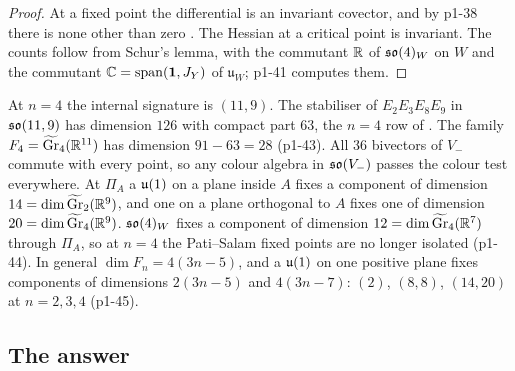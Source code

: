 \begin{proof}
At a fixed point the differential is an invariant covector, and by p1-38 there is none other than zero \cite{Michel71,Palais79}. The Hessian at a critical point is invariant. The
counts follow from Schur's lemma, with the commutant $\mathbb{R}$ of $\mathfrak{so}(4)_W$ on $W$ and the commutant $\mathbb{C}=\operatorname{span}(\mathbf 1,J_Y)$ of $\mathfrak u_W$; p1-41 computes them.
\end{proof}

\begin{remark}
\label{p1:rem:n4}
At $n=4$ the internal signature is $(11,9)$. The stabiliser of $E_2E_3E_8E_9$ in $\mathfrak{so}(11,9)$ has dimension $126$ with compact part $63$, the $n=4$ row of
\cite[Prop.~26.9]{ES17}. The family $F_4=\widetilde{\mathrm{Gr}}_4(\mathbb{R}^{11})$ has dimension $91-63=28$ (p1-43). All $36$ bivectors of $V_-$ commute with every point, so any
colour algebra in $\mathfrak{so}(V_-)$ passes the colour test everywhere. At $\Pi_A$ a $\mathfrak{u}(1)$ on a plane inside $A$ fixes a component of dimension $14=\dim\widetilde{\mathrm{Gr}}_2(\mathbb{R}^9)$,
and one on a plane orthogonal to $A$ fixes one of dimension $20=\dim\widetilde{\mathrm{Gr}}_4(\mathbb{R}^9)$. $\mathfrak{so}(4)_W$ fixes a component of dimension $12=\dim\widetilde{\mathrm{Gr}}_4(\mathbb{R}^7)$
through $\Pi_A$, so at $n=4$ the Pati--Salam fixed points are no longer isolated (p1-44). In general $\dim F_n=4(3n-5)$, and a $\mathfrak{u}(1)$ on one positive plane fixes components of
dimensions $2(3n-5)$ and $4(3n-7)$: $(2)$, $(8,8)$, $(14,20)$ at $n=2,3,4$ (p1-45).
\end{remark}

\subsection{The answer}
\label{p1:sec:answer}

